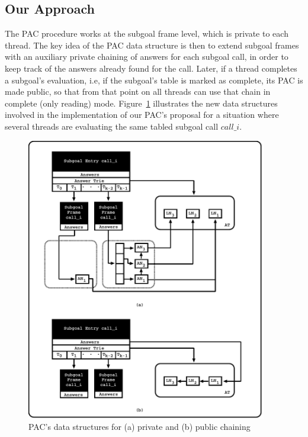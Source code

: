 \documentclass{llncs}
\begin{document}



\subsection{Our Approach}

The PAC procedure works at the subgoal frame level, which is private
to each thread. The key idea of the PAC data structure is then to
extend subgoal frames with an auxiliary private chaining of answers
for each subgoal call, in order to keep track of the answers already
found for the call. Later, if a thread completes a subgoal's
evaluation, i.e, if the subgoal's table is marked as complete, its PAC
is made public, so that from that point on all threads can use that
chain in complete (only reading) mode. Figure~\ref{fig_tabtries_pcc}
illustrates the new data structures involved in the implementation of
our PAC's proposal for a situation where several threads are
evaluating the same tabled subgoal call $call\_i$.

\begin{figure}[!ht]
\vspace{-\intextsep}
\centering
\includegraphics[width=10.5cm]{figures/pcc.pdf}
\caption{PAC's data structures for (a) private and (b) public
  chaining}
\label{fig_tabtries_pcc}
\vspace{-0.5\intextsep}
\end{figure}
\end{document}
